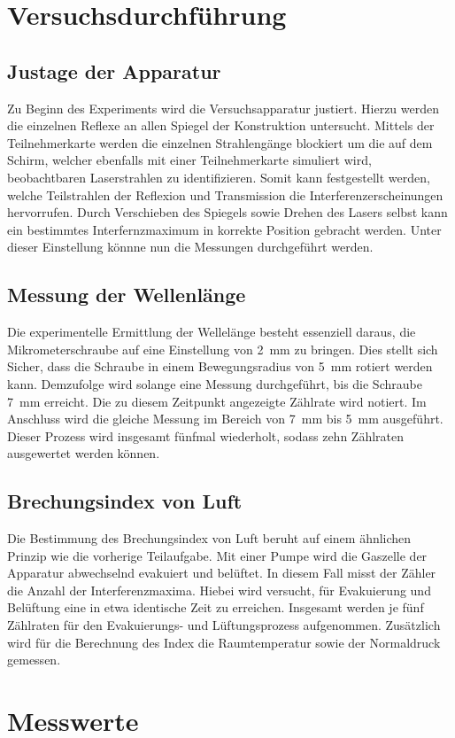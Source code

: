 \section{Versuchsdurchführung}
\label{sec:Versuchsdurchfuehrung}

\subsection{Justage der Apparatur}

Zu Beginn des Experiments wird die Versuchsapparatur justiert. Hierzu werden die einzelnen Reflexe an allen Spiegel der Konstruktion 
untersucht. Mittels der Teilnehmerkarte werden die einzelnen Strahlengänge blockiert um die auf dem Schirm, welcher ebenfalls mit einer 
Teilnehmerkarte simuliert wird, beobachtbaren Laserstrahlen zu identifizieren. Somit kann festgestellt werden, welche Teilstrahlen der 
Reflexion und Transmission die Interferenzerscheinungen hervorrufen. Durch Verschieben des Spiegels  sowie Drehen des Lasers
selbst kann ein bestimmtes Interfernzmaximum in korrekte Position gebracht werden. Unter dieser Einstellung könnne nun die Messungen 
durchgeführt werden.

\subsection{Messung der Wellenlänge}

Die experimentelle Ermittlung der Wellelänge besteht essenziell daraus, die Mikrometerschraube auf eine Einstellung von \qty{2}{\milli\meter}
zu bringen. Dies stellt sich Sicher, dass die Schraube in einem Bewegungsradius von \qty{5}{\milli\meter} rotiert werden kann. Demzufolge wird 
solange eine Messung durchgeführt, bis die Schraube \qty{7}{\milli\meter} erreicht. Die zu diesem Zeitpunkt angezeigte Zählrate wird notiert.
Im Anschluss wird die gleiche Messung im Bereich von \qty{7}{\milli\meter} bis \qty{5}{\milli\meter} ausgeführt. Dieser Prozess wird insgesamt 
fünfmal wiederholt, sodass zehn Zählraten ausgewertet werden können.

\subsection{Brechungsindex von Luft}

Die Bestimmung des Brechungsindex von Luft beruht auf einem ähnlichen Prinzip wie die vorherige Teilaufgabe. Mit einer Pumpe wird die Gaszelle 
der Apparatur abwechselnd evakuiert und belüftet. In diesem Fall misst der Zähler die Anzahl der Interferenzmaxima. Hiebei wird versucht, 
für Evakuierung und Belüftung eine in etwa identische Zeit zu erreichen. Insgesamt werden je fünf Zählraten für den Evakuierungs- und 
Lüftungsprozess aufgenommen. Zusätzlich wird für die Berechnung des Index die Raumtemperatur sowie der Normaldruck gemessen. 

\section{Messwerte}



